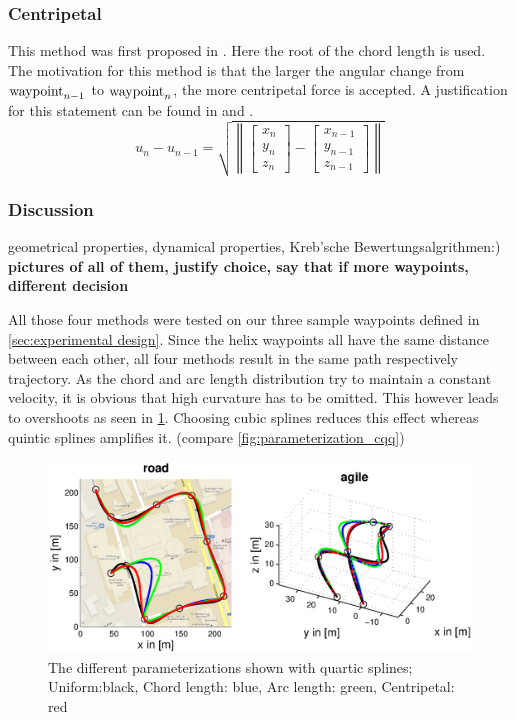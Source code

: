 \subsubsection{Centripetal}
This method was first proposed in \cite{lee}. Here the root of the chord length is used. The motivation for this method is that the larger the angular change from $\textnormal{waypoint}_{n-1}$ to $\textnormal{waypoint}_n$, the more centripetal force is accepted. A justification for this statement can be found in \cite{doessegger} and \cite{lee}.
\begin{equation*}
u_n-u_{n-1}=\sqrt{\left \| \begin{bmatrix}x_n\\y_n\\z_n \end{bmatrix}-\begin{bmatrix}x_{n-1}\\y_{n-1}\\z_{n-1} \end{bmatrix}\right \|}
\end{equation*}

\subsubsection{Discussion}

geometrical properties, dynamical properties, Kreb'sche Bewertungsalgrithmen:) \textbf{pictures of all of them, justify choice, say that if more waypoints, different decision}

All those four methods were tested on our three sample waypoints defined in \ref{sec:experimental design}. Since the helix waypoints all have the same distance between each other, all four methods result in the same path respectively trajectory. As the chord and arc length distribution try to maintain a constant velocity, it is obvious that high curvature has to be omitted. This however leads to overshoots as seen in \ref{fig:parameterizations4_road_agile}. Choosing cubic splines reduces this effect whereas quintic splines amplifies it. (compare \ref{fig:parameterization_cqq})

\begin{figure}[H]
  \begin{minipage}[t]{0.9\textwidth}
    \includegraphics[width = \textwidth]{graphics/Parameterizations4_road_agile.eps}
  \end{minipage}
  \caption{The different parameterizations shown with quartic splines; Uniform:black, Chord length: blue, Arc length: green, Centripetal: red}
  \label{fig:parameterizations4_road_agile}
\end{figure}

